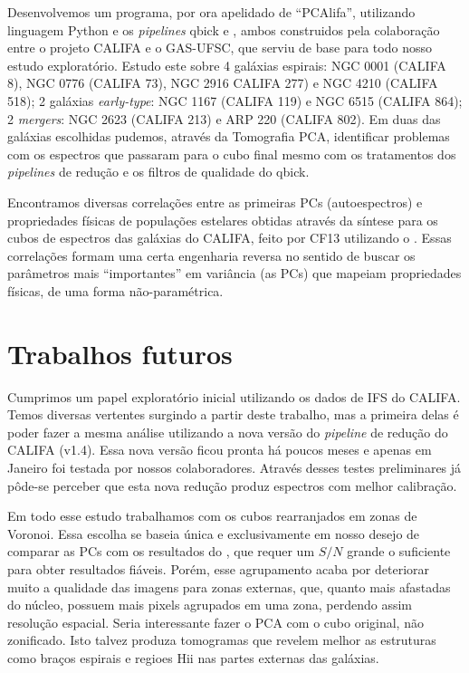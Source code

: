 Desenvolvemos um programa, por ora apelidado de ``PCAlifa'', utilizando linguagem Python e os {\em pipelines} {\sc
qbick} e \pycasso, ambos construidos pela colaboração entre o projeto CALIFA e o GAS-UFSC, que serviu de base para todo
nosso estudo exploratório. Estudo este sobre 4 galáxias espirais: NGC 0001 (CALIFA 8), NGC 0776 (CALIFA 73), NGC 2916
CALIFA 277) e NGC 4210 (CALIFA 518); 2 galáxias {\em early-type}: NGC 1167 (CALIFA 119) e NGC 6515 (CALIFA 864); 2 {\em
mergers}: NGC 2623 (CALIFA 213) e ARP 220 (CALIFA 802). Em duas das galáxias escolhidas pudemos, através da Tomografia
PCA, identificar problemas com os espectros que passaram para o cubo final mesmo com os tratamentos dos {\em pipelines}
de redução e os filtros de qualidade do {\sc qbick}.

Encontramos diversas correlações entre as primeiras PCs (autoespectros) e propriedades físicas de populações estelares
obtidas através da síntese para os cubos de espectros das galáxias do CALIFA, feito por CF13 utilizando o \starlight.
Essas correlações formam uma certa engenharia reversa no sentido de buscar os parâmetros mais ``importantes'' em
variância (as PCs) que mapeiam propriedades físicas, de uma forma não-paramétrica.

\section{Trabalhos futuros}
\label{sec:conclusao:futWorks}

Cumprimos um papel exploratório inicial utilizando os dados de IFS do CALIFA. Temos diversas vertentes surgindo a partir
deste trabalho, mas a primeira delas é poder fazer a mesma análise utilizando a nova versão do {\em pipeline} de redução
do CALIFA (v1.4). Essa nova versão ficou pronta há poucos meses e apenas em Janeiro foi testada por nossos
colaboradores. Através desses testes preliminares já pôde-se perceber que esta nova redução produz espectros com melhor
calibração.

Em todo esse estudo trabalhamos com os cubos rearranjados em zonas de Voronoi. Essa escolha se baseia única e
exclusivamente em nosso desejo de comparar as PCs com os resultados do \starlight, que requer um $S/N$ grande o
suficiente para obter resultados fiáveis. Porém, esse agrupamento acaba por deteriorar muito a qualidade das imagens
para zonas externas, que, quanto mais afastadas do núcleo, possuem mais pixels agrupados em uma zona, perdendo assim
resolução espacial. Seria interessante fazer o PCA com o cubo original, não zonificado. Isto talvez produza tomogramas
que revelem melhor as estruturas como braços espirais e regioes H{\sc ii} nas partes externas das galáxias.

